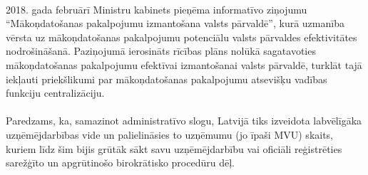 \paragraph{}
2018. gada februārī Ministru kabinets pieņēma informatīvo ziņojumu “Mākoņdatošanas
pakalpojumu izmantošana valsts pārvaldē”, kurā uzmanība vērsta uz mākoņdatošanas
pakalpojumu potenciālu valsts pārvaldes efektivitātes nodrošināšanā. Paziņojumā ierosināts
rīcības plāns nolūkā sagatavoties mākoņdatošanas pakalpojumu efektīvai izmantošanai
valsts pārvaldē, turklāt tajā iekļauti priekšlikumi par mākoņdatošanas pakalpojumu atsevišķu
vadības funkciju centralizāciju.
\paragraph{}
Paredzams, ka, samazinot administratīvo slogu, Latvijā tiks izveidota labvēlīgāka
uzņēmējdarbības vide un palielināsies to uzņēmumu (jo īpaši MVU) skaits, kuriem līdz šim
bijis grūtāk sākt savu uzņēmējdarbību vai oficiāli reģistrēties sarežģīto un apgrūtinošo
birokrātisko procedūru dēļ.
